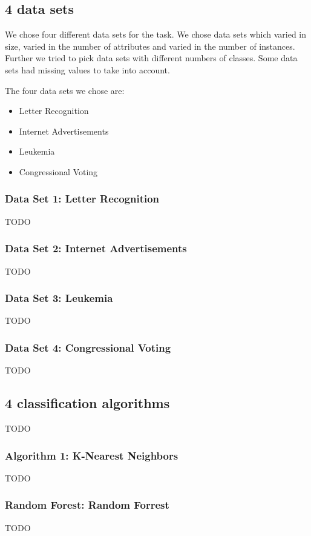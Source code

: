 \documentclass{sig-alternate-05-2015}
\begin{document}
\subsection{4 data sets}
We chose four different data sets for the task. We chose data sets which varied in size, varied in the number of attributes and varied in the number of instances. Further we tried to pick data sets with different numbers of classes. Some data sets had missing values to take into account.

The four data sets we chose are:

\begin{itemize}
\item Letter Recognition
\item Internet Advertisements
\item Leukemia
\item Congressional Voting
\end{itemize}

\subsubsection{Data Set 1: Letter Recognition}
TODO\\
\subsubsection{Data Set 2: Internet Advertisements}
TODO\\
\subsubsection{Data Set 3: Leukemia}
TODO\\
\subsubsection{Data Set 4: Congressional Voting}
TODO\\


\subsection{4 classification algorithms}
TODO\\

\subsubsection{Algorithm 1: K-Nearest Neighbors}
TODO\\
\subsubsection{Random Forest: Random Forrest}
TODO\\
\end{document}
